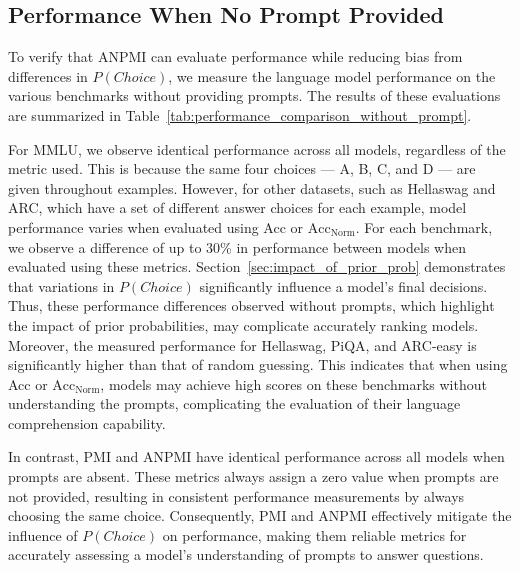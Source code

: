 \subsection{Performance When No Prompt Provided}
To verify that ANPMI can evaluate performance while reducing bias from differences in {\small $P(Choice)$}, we measure the language model performance on the various benchmarks without providing prompts. The results of these evaluations are summarized in Table~\ref{tab:performance_comparison_without_prompt}. 

For MMLU, we observe identical performance across all models, regardless of the metric used.  This is because the same four choices — A, B, C, and D — are given throughout examples.  However, for other datasets, such as Hellaswag and ARC, which have a set of different answer choices for each example, model performance varies when evaluated using Acc or $\text{Acc}_\text{Norm}$.  For each benchmark, we observe a difference of up to 30\% in performance between models when evaluated using these metrics.  Section~\ref{sec:impact_of_prior_prob} demonstrates that variations in {\small $P(Choice)$} significantly influence a model's final decisions.  Thus, these performance differences observed without prompts, which highlight the impact of prior probabilities, may complicate accurately ranking models.  Moreover, the measured performance for Hellaswag, PiQA, and ARC-easy is significantly higher than that of random guessing.  This indicates that when using Acc or $\text{Acc}_\text{Norm}$, models may achieve high scores on these benchmarks without understanding the prompts, complicating the evaluation of their language comprehension capability.

In contrast, PMI and ANPMI have identical performance across all models when prompts are absent. These metrics always assign a zero value when prompts are not provided, resulting in consistent performance measurements by always choosing the same choice. Consequently, PMI and ANPMI effectively mitigate the influence of {\small $P(Choice)$} on performance, making them reliable metrics for accurately assessing a model's understanding of prompts to answer questions.

\begin{table}[!t]
\centering
\caption{The proportion of choices selected in the MMLU task based on PMI and ANPMI metrics for the LLaMA3.1-8B model.}
\label{tab:pmi_and_anpmi}
\end{table}

